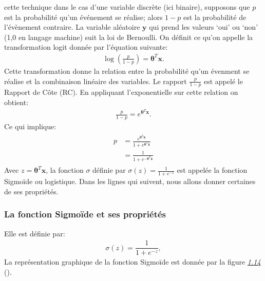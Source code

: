 \documentclass[letterpaper,11pt,english]{sphinxmanual}
\begin{document}
cette technique dans le cas d’une variable discrète (ici binaire),
supposons que \(p\) est la probabilité qu’un événement se réalise;
alors \(1-p\) est la probabilité de l’évènement contraire. La
variable aléatoire \(\mathbf{y}\) qui prend les valeurs ‘oui’ ou
‘non’ (1,0 en langage machine) suit la loi de Bernoulli. On définit ce
qu’on appelle la transformation logit donnée par l’équation suivante:
\begin{equation}\label{equation:chapter3:chapter3:30}
\begin{split}\log\left(\frac{p}{1-p}\right)=\boldsymbol{\theta}^T\mathbf{x} .\end{split}
\end{equation}
\sphinxAtStartPar
Cette transformation donne la relation entre la probabilité qu’un
évenment se réalise et la combinaison linéaire des variables. Le rapport
\(\frac{p}{1-p}\) est appelé le Rapport de Côte (RC). En appliquant
l’exponentielle sur cette relation on obtient:
\begin{equation}\label{equation:chapter3:chapter3:31}
\begin{split}\frac{p}{1-p} =  e^{\boldsymbol{\theta}^T\mathbf{x}}.\end{split}
\end{equation}
\sphinxAtStartPar
Ce qui implique:
\begin{equation}\label{equation:chapter3:chapter3:32}
\begin{split}\begin{aligned}
p &=\frac{e^{\boldsymbol{\theta}^T\mathbf{x}}}{1+e^{\boldsymbol{\theta}^T\mathbf{x}}}\nonumber\\
&=\frac{1}{1+e^{-\boldsymbol{\theta}^T\mathbf{x}}}\end{aligned}\end{split}
\end{equation}
\sphinxAtStartPar
Avec \(z= \boldsymbol{\theta}^T\mathbf{x}\), la fonction
\(\sigma\) définie par
\(\displaystyle \sigma(z)=\frac{1}{1+e^{-z}}\) est appelée la
fonction Sigmoïde ou logistique. Dans les lignes qui suivent, nous
allons donner certaines de ses propriétés.


\subsubsection{La fonction Sigmoïde et ses propriétés}
\label{\detokenize{chapter3:la-fonction-sigmoide-et-ses-proprietes}}
\sphinxAtStartPar
Elle est définie par:
\begin{equation}\label{equation:chapter3:chapter3:33}
\begin{split}\sigma(z)=\dfrac{1}{1+e^{-z}},\end{split}
\end{equation}
\sphinxAtStartPar
La représentation graphique de la fonction Sigmoïde est donnée par la
figure {\hyperref[\detokenize{chapter3:sigmoid}]{\emph{1.14}}} ().
\end{document}
